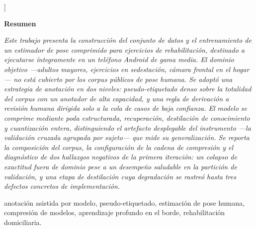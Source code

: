 \documentclass[10pt,a4paper,twocolumn]{article}
\begin{document}
{%
\vspace{2\baselineskip}
}]

\begin{center}
{\fontsize{12}{14}\selectfont\bfseries Resumen}
\end{center}
\begingroup\itshape
\noindent Este trabajo presenta la construcción del conjunto de datos y el
entrenamiento de un estimador de pose comprimido para ejercicios de
rehabilitación, destinado a ejecutarse íntegramente en un teléfono Android de
gama media. El dominio objetivo ---adultos mayores, ejercicios en
sedestación, cámara frontal en el hogar--- no está cubierto por los corpus
públicos de pose humana. Se adoptó una estrategia de anotación en dos
niveles: pseudo-etiquetado denso sobre la totalidad del corpus con un
anotador de alta capacidad, y una regla de derivación a revisión humana
dirigida solo a la cola de casos de baja confianza. El modelo se comprime
mediante poda estructurada, recuperación, destilación de conocimiento y
cuantización entera, distinguiendo el artefacto desplegable del instrumento
---la validación cruzada agrupada por sujeto--- que mide su generalización.
Se reporta la composición del corpus, la configuración de la cadena de
compresión y el diagnóstico de dos hallazgos negativos de la primera
iteración: un colapso de exactitud fuera de dominio pese a un desempeño
saludable en la partición de validación, y una etapa de destilación cuya
degradación se rastreó hasta tres defectos concretos de implementación.
\endgroup

\vspace{6pt}
 anotación asistida
por modelo, pseudo-etiquetado, estimación de pose humana, compresión de modelos,
aprendizaje profundo en el borde, rehabilitación domiciliaria.
\end{document}
